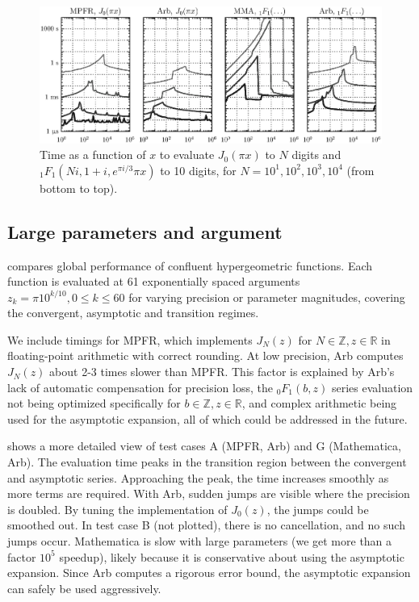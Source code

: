 \documentclass[review,nohypdvips]{siamart0216}
\begin{document}
\begin{figure}[!htb]
\centering
\includegraphics[scale=0.59]{timings.eps}
\caption{Time as a function of $x$ to evaluate $J_0(\pi x)$ to $N$ digits and ${}_1F_1(Ni,1+i,e^{\pi i / 3} \pi x)$ to 10 digits,
for $N = 10^1, 10^2, 10^3, 10^4$ (from bottom to top).}
\label{fig:timings}
\end{figure}

\subsection{Large parameters and argument}

 compares global performance of
confluent hypergeometric functions.
Each function is evaluated at 61 exponentially spaced arguments
$z_k = \pi 10^{k/10}, 0 \le k \le 60$
for varying precision or parameter magnitudes,
covering the convergent, asymptotic and transition regimes.

We include timings for MPFR, which implements $J_N(z)$ for $N \in \mathbb{Z}, z \in \mathbb{R}$
in floating-point arithmetic with correct rounding.
At low precision, Arb computes $J_N(z)$ about 2-3 times slower than MPFR.
This factor is explained by Arb's lack of automatic compensation for precision loss,
the ${}_0F_1(b,z)$ series evaluation not being optimized specifically for $b \in \mathbb{Z}, z \in \mathbb{R}$,
and complex arithmetic being used for the asymptotic expansion,
all of which could be addressed in the future.

 shows a more detailed view of test cases A (MPFR, Arb) and G (Mathematica, Arb).
The evaluation time peaks in the transition region between the convergent and asymptotic series.
Approaching the peak, the time increases smoothly as more terms are required.
With Arb, sudden jumps are visible where the precision is doubled.
By tuning the implementation of $J_0(z)$, the jumps could be smoothed out.
In test case B (not plotted), there is no cancellation, and no such jumps occur.
Mathematica is slow with large parameters (we get more than a factor $10^5$ speedup),
likely because it is conservative about using the asymptotic expansion.
Since Arb computes a rigorous error bound, the asymptotic expansion
can safely be used aggressively.
\end{document}
